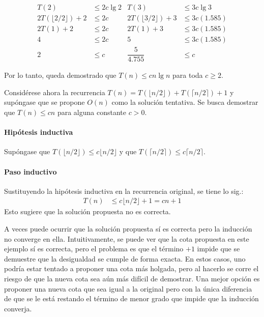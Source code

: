 \begin{expl}
    \begin{align*}
        T(2) & \leq 2c\lg2 & T(3) & \leq 3c\lg3 \\
        2T(\lfloor 2/2 \rfloor) + 2 & \leq 2c & 2T(\lfloor 3/2 \rfloor) + 3 & \leq 3c(1.585) \\
        2T(1) + 2 & \leq2c & 2T(1) + 3 & \leq 3c(1.585) \\
        4 & \leq 2c & 5 & \leq 3c(1.585) \\
        2 & \leq c & \dfrac{5}{4.755} & \leq c
    \end{align*}
    
    Por lo tanto, queda demostrado que $T(n)\leq cn\lg{n}$ para toda $c\geq 2$.
    \exend
\end{expl}

\begin{expl}
    Considérese ahora la recurrencia $T(n)=T(\lfloor n/2\rfloor)+T(\lceil n/2\rceil)+1$ y 
    supóngase que se propone $O(n)$ como la solución tentativa. Se busca demostrar que
    $T(n)\leq cn$ para alguna constante $c>0$.
    
    \paragraph{Hipótesis inductiva}
    Supóngase que $T(\lfloor n/2\rfloor)\leq c\lfloor n/2\rfloor$ y que 
    $T(\lceil n/2\rceil)\leq c\lceil n/2\rceil$.
    
    \paragraph{Paso inductivo}
    Sustituyendo la hipótesis inductiva en la recurrencia original, se tiene lo sig.:
    \begin{align*}
        T(n) &\leq c\lfloor n/2 \rfloor + 1 = cn + 1
    \end{align*}
    Esto sugiere que la solución propuesta no es correcta. 
    
    A veces puede ocurrir que 
    la solución propuesta sí es correcta pero la inducción no converge en ella.
    Intuitivamente, se puede ver que la cota propuesta en este ejemplo sí es correcta,
    pero el problema es que el término $+1$ impide que se demuestre que la desigualdad 
    se cumple de forma exacta. En estos casos, uno podría estar tentado a proponer una
    cota más holgada, pero al hacerlo se corre el riesgo de que la nueva cota sea
    aún más difícil de demostrar. Una mejor opción es proponer una nueva cota
    que sea igual a la original pero con la única diferencia de que se le está restando
    el término de menor grado que impide que la inducción converja. 
    

\end{expl}
